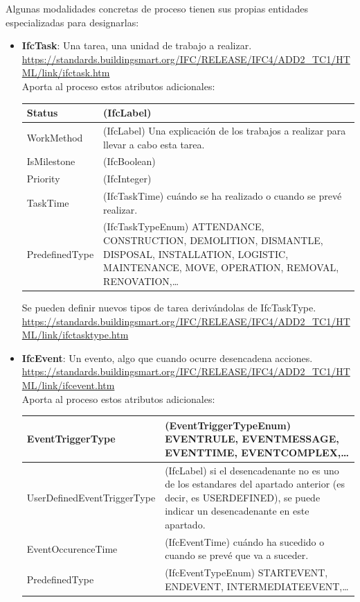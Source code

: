 \documentclass[spanish,12pt,a4paper,final,oneside]{book}
\begin{document}
\vspace{0.3cm}
Algunas modalidades concretas de proceso tienen sus propias entidades especializadas para designarlas:
\begin{itemize}

\item \textbf{IfcTask}: Una tarea, una unidad de trabajo a realizar.
\\ \url{https://standards.buildingsmart.org/IFC/RELEASE/IFC4/ADD2_TC1/HTML/link/ifctask.htm}
\\Aporta al proceso estos atributos adicionales:
\\ \begin{longtable}{|p{3.5cm} p{10cm}|}
\hline
Status & (IfcLabel)
\\[0.1cm] \hline
WorkMethod & (IfcLabel) Una explicación de los trabajos a realizar para llevar a cabo esta tarea.
\\[0.1cm] \hline
IsMilestone & (IfcBoolean)
\\[0.1cm] \hline
Priority & (IfcInteger)
\\[0.1cm] \hline
TaskTime & (IfcTaskTime) cuándo se ha realizado o cuando se prevé realizar.
\\[0.1cm] \hline
PredefinedType & (IfcTaskTypeEnum) ATTENDANCE, CONSTRUCTION, DEMOLITION, DISMANTLE, DISPOSAL, INSTALLATION, LOGISTIC, MAINTENANCE, MOVE, OPERATION, REMOVAL, RENOVATION,\ldots
\\[0.1cm] \hline
\end{longtable}

Se pueden definir nuevos tipos de tarea derivándolas de IfcTaskType.
\\ \url{https://standards.buildingsmart.org/IFC/RELEASE/IFC4/ADD2_TC1/HTML/link/ifctasktype.htm} 


\item \textbf{IfcEvent}: Un evento, algo que cuando ocurre desencadena acciones.
\\ \url{https://standards.buildingsmart.org/IFC/RELEASE/IFC4/ADD2_TC1/HTML/link/ifcevent.htm}
\\Aporta al proceso estos atributos adicionales:
\\ \begin{longtable}{|p{4cm} p{10cm}|}
\hline
EventTriggerType & (EventTriggerTypeEnum) EVENTRULE, EVENTMESSAGE, EVENTTIME, EVENTCOMPLEX,\ldots
\\[0.1cm] \hline
UserDefinedEventTriggerType & (IfcLabel) si el desencadenante no es uno de los estandares del apartado anterior (es decir, es USERDEFINED), se puede indicar un desencadenante en este apartado.
\\[0.1cm] \hline
EventOccurenceTime & (IfcEventTime) cuándo ha sucedido o cuando se prevé que va a suceder.
\\[0.1cm] \hline
PredefinedType & (IfcEventTypeEnum) STARTEVENT, ENDEVENT, INTERMEDIATEEVENT,\ldots
\\[0.1cm] \hline
\end{longtable}


\end{itemize}
\end{document}
